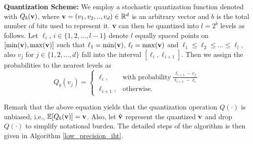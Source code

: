 \documentclass{article}
\begin{document}
{\bf Quantization Scheme:} We employ a stochastic quantization function denoted with $Q_b({\bf v})$, where ${\bf v}=(v_1, v_2, .., v_d) \in \mathbb{R}^d$ is an arbitrary vector and $b$ is the total number of bits used to represent it. {\bf v} can then be quantized into $l=2^b$ levels as follows. Let $\ell_i$, $i\in \{1, 2, ..., l-1 \}$ denote $l$ equally spaced points on $[\min({\bf v}), \max({\bf v})]$ such that $\ell_1=\min({\bf v})$, $\ell_l=\max({\bf v})$ and $\ell_1\leq\ell_2 \leq ... \leq \ell_l$, also $v_j$ for $j\in \{1, 2, ..., d \}$ fall into the interval $[\ell_i, \ell_{i+1}]$. Then we assign the probabilities to the nearest levels as
\[
    Q_b(v_j) = \left\{\begin{array}{lr}
        \ell_i, & \textrm{with probability} \ \frac{\ell_{i+1}-v_j}{\ell_{i+1}-\ell_i}\\
        \ell_{i+1},&\textrm{otherwise}.  \ \ \ \  \ \ \ \ \ \ \ \ \ \ \ \ \ \ 
        \end{array}
\]
  
Remark that the above equation yields that the quantization operation $Q(\cdot)$ is unbiased, i.e., $\mathbb{E}[Q_b({\bf v})] = {\bf v}$. Also, let $\hat{{\bf v}}$ represent the quantized ${\bf v}$ and drop $Q(\cdot)$ to simplify notational burden. The detailed steps of the algorithm is then given in Algorithm \ref{low_precision_iht}.
\end{document}
